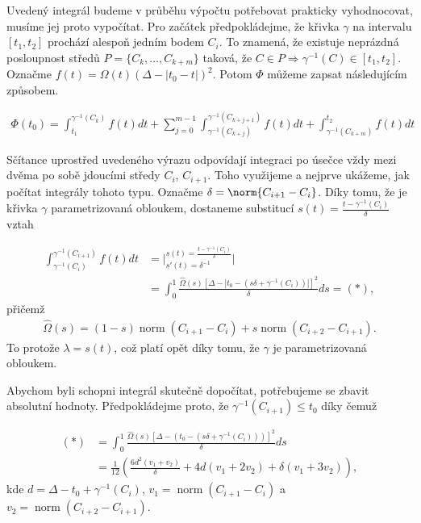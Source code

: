 Uvedený integrál budeme v průběhu výpočtu potřebovat prakticky vyhodnocovat,
musíme jej proto vypočítat. Pro začátek předpokládejme, že křivka $ \gamma $ na
intervalu $ [t_1, t_2] $ prochází alespoň jedním bodem $ C_i $. To znamená, že
existuje neprázdná posloupnost středů $ P = \{C_k, \dots, C_{k + m} \}$ taková, že
$ C \in P \Rightarrow \gamma^{-1}(C) \in [t_1, t_2]$. Označme
$ f(t) = \Omega(t) (\Delta - \left| t_0 - t \right| )^2 $. Potom $ \Phi $ můžeme zapsat
následujícím způsobem.

\begin{align} \label{eq:integral_sum}
    \Phi(t_0) = \int_{t_1}^{\gamma^{-1}(C_k)} f(t) dt
        + \sum_{j=0}^{m - 1} \int_{\gamma^{-1}(C_{k + j})}^{\gamma^{-1}(C_{k + j + 1})} f(t) dt
        + \int_{\gamma^{-1}(C_{k + m})}^{t_2} f(t) dt
\end{align}

Sčítance uprostřed uvedeného výrazu odpovídají integraci po úsečce vždy mezi
dvěma po sobě jdoucími středy $ C_i $, $C_{i+1} $. Toho využijeme a nejprve ukážeme,
jak počítat integrály tohoto typu. Označme $\delta = \norm{C_{i + 1} - C_i}$.
Díky tomu, že je křivka $ \gamma $ parametrizovaná
obloukem, dostaneme substitucí
$ s(t) = \frac{t - \gamma^{-1}(C_i)}{\delta} $ vztah

\begin{align*}
    \int_{\gamma^{-1}(C_{i})}^{\gamma^{-1}(C_{i + 1})} f(t) dt
    &= \bigg\rvert
        ^{s(t) = \frac{t - \gamma^{-1}(C_i)}{\delta}}
        _{s'(t) = \delta^{-1}} \bigg\lvert \\
    &= \int_{0}^{1}
        \frac{\widehat{\Omega}(s)
            \left[\Delta - \left| t_0 - (s \delta + \gamma^{-1}(C_i)) \right| \right]^2}
        {\delta} ds
    = (*),
\end{align*}
přičemž
\begin{align*}
    \widehat{\Omega}(s) = (1 - s) \operatorname{norm}(C_{i + 1} - C_i)
            + s \operatorname{norm}(C_{i + 2} - C_{i + 1}).
\end{align*}
To protože $ \lambda = s(t) $, což platí opět díky tomu, že $ \gamma $ je
parametrizovaná obloukem.

Abychom byli schopni integrál skutečně dopočítat, potřebujeme se zbavit absolutní
hodnoty. Předpokládejme proto, že $ \gamma^{-1}(C_{i + 1}) \leq t_0$ díky čemuž

\begin{align}
    (*) &= \int_{0}^{1}
        \frac{\widehat{\Omega}(s)
            \left[\Delta - (t_0 - (s \delta + \gamma^{-1}(C_i)) ) \right]^2}
        {\delta}
         ds \\
    &= \frac{1}{12} \left(
        \frac{6 d^2 (v_1+v_2 )}{\delta}
        + 4 d (v_1+2 v_2 )
        + \delta (v_1+3 v_2 ) \right), \label{eq:result_1}
\end{align}
kde $ d = \Delta - t_0 + \gamma^{-1}(C_i) $,
$ v_1 = \operatorname{norm}(C_{i + 1} - C_i) $ a
$ v_2 = \operatorname{norm}(C_{i + 2} - C_{i + 1})$.

